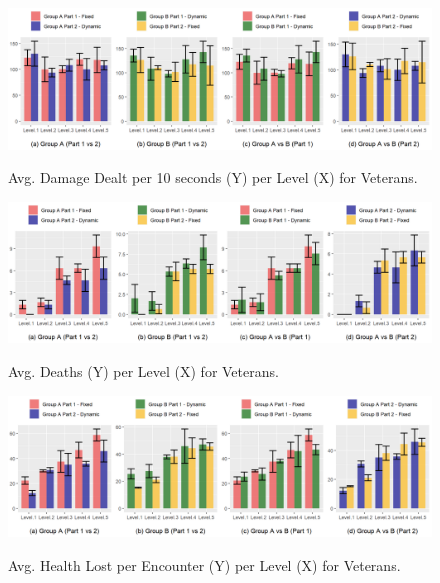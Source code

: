 \begin{figure}[!ht]
    \begin{center}
    \caption{Avg. Damage Dealt per 10 seconds (Y) per Level (X) for Veterans.}
        \includegraphics[width=34em]{figures/damage_dealt_per_10s-veteran_players.png}
        \label{fig:result-metric-veterans-damage-dealt-per-10s}
    \end{center}
\end{figure}

\begin{figure}[!ht]
    \begin{center}
    \caption{Avg. Deaths (Y) per Level (X) for Veterans.}
        \includegraphics[width=34em]{figures/deaths_per_level-veteran_players.png}
        \label{fig:result-metric-veterans-deaths-per-level}
    \end{center}
\end{figure}

\begin{figure}[!ht]
    \begin{center}
    \caption{Avg. Health Lost per Encounter (Y) per Level (X) for Veterans.}
        \includegraphics[width=34em]{figures/health_lost_per_encounter-veteran_players.png}
        \label{fig:result-metric-veterans-health-lost-per-encounter}
    \end{center}
\end{figure}

